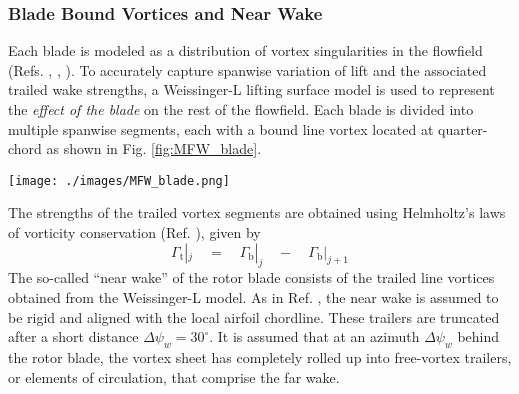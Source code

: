 \subsubsection*{Blade Bound Vortices and Near Wake}
Each blade is modeled as a distribution of vortex singularities in the flowfield (Refs. \cite{BagaiPHD}, \cite{Bhagwat}, \cite{Ananthan}). To accurately capture spanwise variation of lift and the associated trailed wake strengths, a Weissinger-L lifting surface model is used to represent the \emph{effect of the blade} on the rest of the flowfield. Each blade is divided into multiple spanwise segments, each with a bound line vortex located at quarter-chord as shown in Fig. \ref{fig:MFW_blade}.
\begin{Figure}
 \centering
 \texttt{[image: ./images/MFW\_blade.png]}
 \label{fig:MFW_blade}
\end{Figure}
\vspace{0.5cm}
The strengths of the trailed vortex segments are obtained using Helmholtz's laws of vorticity conservation (Ref. \cite{Saffman}), given by 
\[ \Gamma_\textrm{t}|_j \quad = \quad \Gamma_\textrm{b}|_j \quad - \quad \Gamma_\textrm{b}|_{j+1} \]
The so-called ``near wake'' of the rotor blade consists of the  trailed line vortices obtained from the Weissinger-L model. As in Ref. \cite{Ananthan}, the near wake is assumed to be rigid and aligned with the local airfoil chordline. These trailers are truncated after a short distance $\Delta \psi_w = 30^\circ$. It is assumed that at an azimuth $\Delta \psi_w$ behind the rotor blade, the vortex sheet has completely rolled up into free-vortex trailers, or elements of circulation, that comprise the far wake.

